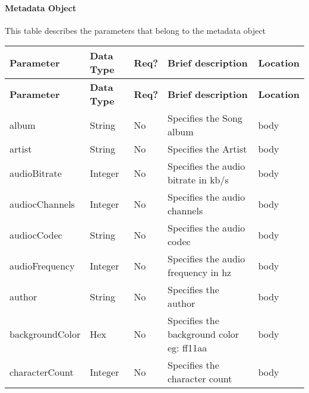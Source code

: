 
\paragraph*{Metadata Object}

This table describes the parameters that belong to the metadata object

{\footnotesize{}}%
\begin{longtable}{|>{\raggedright}p{}|>{\raggedright}p{}|>{\raggedright}p{}|>{\raggedright}p{}|>{\raggedright}p{}|}
\hline
\hline 
\textbf{\footnotesize{Parameter }} & \textbf{\footnotesize{Data Type}} & \textbf{\footnotesize{Req?}} & \textbf{\footnotesize{Brief description}} & \textbf{\footnotesize{Location}}\tabularnewline
\hline 
\hline
\endfirsthead
\hline
\hline 
\textbf{\footnotesize{Parameter }} & \textbf{\footnotesize{Data Type}} & \textbf{\footnotesize{Req?}} & \textbf{\footnotesize{Brief description}} & \textbf{\footnotesize{Location}}\tabularnewline
\hline 
\hline
\endhead
\hline 
{\footnotesize{album}} & {\footnotesize{String}} & {\footnotesize{No}} & {\footnotesize{Specifies the Song album}} & {\footnotesize{body}}\tabularnewline
\hline 
{\footnotesize{artist}} & {\footnotesize{String}} & {\footnotesize{No}} & {\footnotesize{Specifies the Artist}} & {\footnotesize{body}}\tabularnewline
\hline 
{\footnotesize{audioBitrate}} & {\footnotesize{Integer }} & {\footnotesize{No}} & {\footnotesize{Specifies the audio bitrate in kb/s}} & {\footnotesize{body}}\tabularnewline
\hline 
{\footnotesize{audiocChannels}} & {\footnotesize{Integer}} & {\footnotesize{No}} & {\footnotesize{Specifies the audio channels}} & {\footnotesize{body}}\tabularnewline
\hline 
{\footnotesize{audiocCodec}} & {\footnotesize{String}} & {\footnotesize{No}} & {\footnotesize{Specifies the audio codec}} & {\footnotesize{body}}\tabularnewline
\hline 
{\footnotesize{audioFrequency}} & {\footnotesize{Integer }} & {\footnotesize{No}} & {\footnotesize{Specifies the audio frequency in hz}} & {\footnotesize{body}}\tabularnewline
\hline 
{\footnotesize{author}} & {\footnotesize{String}} & {\footnotesize{No}} & {\footnotesize{Specifies the author}} & {\footnotesize{body}}\tabularnewline
\hline 
{\footnotesize{backgroundColor}} & {\footnotesize{Hex}} & {\footnotesize{No}} & {\footnotesize{Specifies the background color eg: ff11aa}} & {\footnotesize{body}}\tabularnewline
\hline 
{\footnotesize{characterCount}} & {\footnotesize{Integer}} & {\footnotesize{No}} & {\footnotesize{Specifies the character count}} & {\footnotesize{body}}\tabularnewline

\end{longtable}

